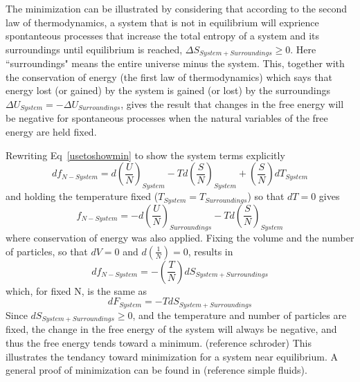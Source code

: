 \documentclass[double,12pt]{beavtex}
\begin{document}
The minimization can be illustrated by considering that according to the second law of thermodynamics, a system that is not in equilibrium will exprience spontanteous processes that increase the total entropy of a system and its surroundings until equilibrium is reached, $\Delta{S}_{System + Surroundings} \geq 0$. Here ``surroundings" means the entire universe minus the system. This, together with the conservation of energy (the first law of thermodynamics) which says that energy lost (or gained) by the system is gained (or lost) by the surroundings $\Delta{U}_{System}=-\Delta{U}_{Surroundings}$, gives the result that changes in the free energy will be negative for spontaneous processes when the natural variables of the free energy are held fixed. %

Rewriting Eq~\ref{usetoshowmin} to show the system terms explicitly
\begin{equation}
  df_{N-System}=d\left(\frac{U}{N}\right)_{System}-Td\left(\frac{S}{N}\right)_{System}+\left(\frac{S}{N}\right)dT_{System}
\end{equation}
and holding the temperature fixed ($T_{System}=T_{Surroundings}$) so that $dT=0$ gives
\begin{equation}
  f_{N-System}=-d\left(\frac{U}{N}\right)_{Surroundings}-Td\left(\frac{S}{N}\right)_{System}
\end{equation}
where conservation of energy was also applied. Fixing the volume and the number of particles, so that $dV=0$ and $d\left(\frac{1}{N}\right)=0$, results in
\begin{equation}
  df_{N-System}=-\left(\frac{T}{N}\right)dS_{System+Surroundings}
\end{equation}
which, for fixed N, is the same as
\begin{equation}dF_{System}=-TdS_{System+Surroundings} \end{equation} Since $dS_{System+Surroundings} \geq{0}$, and the temperature and number of particles are fixed, the change in the free energy of the system will always be negative, and thus the free energy tends toward a minimum. (reference schroder) This illustrates the tendancy toward minimization for a system near equilibrium. A general proof of minimization can be found in (reference simple fluids).
\end{document}
